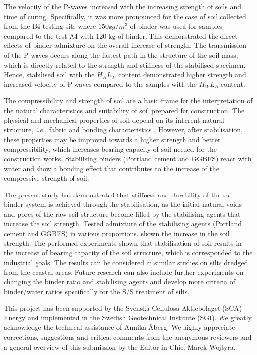 \documentclass{amestyle}
\begin{document}
The velocity of the P-waves increased with the increasing strength of soils and time of curing. Specifically, it was more pronounced for the case of soil collected from the B4 testing site where $150 kg/m^3$ of binder was used for samples compared to the test A4 with 120 kg of binder. This demonstrated the direct effects of binder admixture on the overall increase of strength. The transmission of the P-waves occurs along the fastest path in the structure of the soil mass, which is directly related to the strength and stiffness of the stabilised specimen. Hence, stabilised soil with the $H_BL_W$ content demonstrated higher strength and increased velocity of P-waves compared to the samples with the $H_WL_B$  content.

The compressibility and strength of soil are a basic frame for the interpretation of the natural characteristics and suitability of soil prepared for construction. The physical and mechanical properties of soil depend on its inherent natural structure, \emph{i.e.}, fabric and bonding characteristics \cite{Burland}. However, after stabilisation, these properties may be improved towards a higher strength and better compressibility, which increases bearing capacity of soil needed for the construction works. Stabilising binders (Portland cement and GGBFS) react with water and show a bonding effect that contributes to the increase of the compressive strength of soil. 

The present study has demonstrated that stiffness and durability of the soil-binder system is achieved through the stabilisation, as the initial natural voids and pores of the raw soil structure become filled by the stabilising agents that increase the soil strength. Tested admixture of the stabilising agents (Portland cement and GGBFS) in various proportions, shown the increase in the soil strength. The performed experiments shown that stabilisation of soil results in the increase of bearing capacity of the soil structure, which is corresponded to the industrial goals. The results can be considered in similar studies on silts dredged from the coastal areas. Future research can also include further experiments on changing the binder ratio and stabilising agents and develop more criteria of binder/water ratios specifically for the S/S treatment of silts.

\begin{acknowledgements}
This project has been supported by the Svenska Cellulosa Aktiebolaget (SCA) Energy and implemented in the Swedish Geotechnical Institute (SGI). We greatly acknowledge the technical assistance of Annika Åberg. We highly appreciate corrections, suggestions and critical comments from the anonymous reviewers and a general overview of this submission by the Editor-in-Chief Marek Wojtyra.
\end{acknowledgements}
\end{document}
